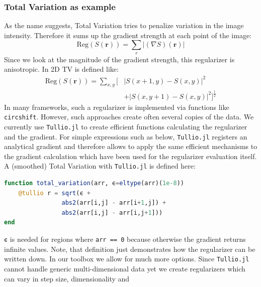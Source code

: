 \documentclass{juliacon}
\begin{document}
    \subsubsection{Total Variation as example}
        As the name suggests, Total Variation tries to penalize variation in the image intensity. Therefore it sums up the gradient strength at each point
        of the image:
        \begin{equation}
            \text{Reg}(S(\mathbf r)) = \sum_r  |(\nabla S)(\mathbf r)|
        \end{equation}
        Since we look at the magnitude of the gradient strength, this regularizer is anisotropic.
        In 2D TV is defined like: 
        \begin{equation}
        \begin{split}
            \text{Reg}(S(\mathbf r)) = \sum_{x,y} \big[& |S(x + 1, y) - S(x, y)|^2 \\[-0.4cm] 
                                                & + |S(x, y + 1) - S(x, y)|^2\big]^{\frac12}
        \end{split}
        \end{equation}
        In many frameworks, such a regularizer is implemented via functions like \lstinline{circshift}. 
        However, such approaches create often several copies of the data. 
        We currently use \verb|Tullio.jl|\cite{michael_abbott_2021_5047410} to create efficient functions 
        calculating the regularizer and the gradient. For simple expressions
        such as below, \verb|Tullio.jl| registers an analytical gradient and therefore allows to apply the same efficient mechanisms 
        to the gradient calculation which have been used for the regularizer evaluation itself.
        A (smoothed) Total Variation with \verb|Tullio.jl| is defined here:
        \begin{lstlisting}[language = Julia]
function total_variation(arr, ϵ=eltype(arr)(1e-8))
    @tullio r = sqrt(ϵ + 
                abs2(arr[i,j] - arr[i+1,j]) +
                abs2(arr[i,j] - arr[i,j+1]))
end
        \end{lstlisting}
        \lstinline{ϵ} is needed for regions where \lstinline{arr == 0} because otherwise the gradient returns infinite values.
        Note, that definition just demonstrates how the regularizer can be written down.
        In our toolbox we allow for much more options. Since \verb|Tullio.jl| cannot handle generic multi-dimensional data yet
        we create regularizers which can vary in step size, dimensionality and
\end{document}
